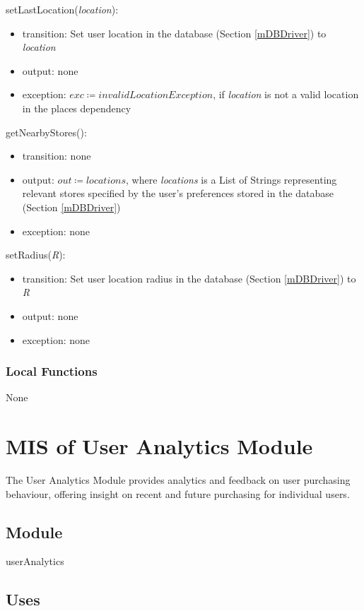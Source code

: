 \documentclass[12pt, titlepage]{article}
\begin{document}
\noindent setLastLocation(\textit{location}):
\begin{itemize}
\item transition: Set user location in the database (Section \ref{mDBDriver}) to \textit{location}
\item output: none
\item exception: \( \textit{exc} \coloneqq invalidLocationException \), if \textit{location} is not a valid location in the places dependency
\end{itemize}

\noindent getNearbyStores():
\begin{itemize}
\item transition: none
\item output: \( \textit{out} \coloneqq locations \), where \textit{locations} is a List of Strings representing relevant stores specified by the user's preferences stored in the database (Section \ref{mDBDriver})
\item exception: none
\end{itemize}

\noindent setRadius(\textit{R}):
\begin{itemize}
\item transition: Set user location radius in the database (Section \ref{mDBDriver}) to \textit{R}
\item output: none
\item exception: none
\end{itemize}


\subsubsection{Local Functions}
None

\newpage

\section{MIS of User Analytics Module} \label{mAnalytics} 
The User Analytics Module provides analytics and feedback on user purchasing behaviour, offering insight on recent and future purchasing for individual users.

\subsection{Module}

userAnalytics

\subsection{Uses}
\end{document}
